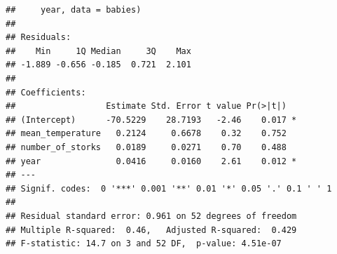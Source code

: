 \documentclass[12pt,a4paper]{scrartcl}\usepackage[]{graphicx}\usepackage[]{color}
\makeatletter
\newenvironment{kframe}{%
 \def\at@end@of@kframe{}%
 \ifinner\ifhmode%
  \def\at@end@of@kframe{\end{minipage}}%
  \begin{minipage}{\columnwidth}%
 \fi\fi%
 \def\FrameCommand##1{\hskip\@totalleftmargin \hskip-\fboxsep
 \colorbox{shadecolor}{##1}\hskip-\fboxsep
     \hskip-\linewidth \hskip-\@totalleftmargin \hskip\columnwidth}%
 \MakeFramed {\advance\hsize-\width
   \@totalleftmargin\z@ \linewidth\hsize
   \@setminipage}}%
 {\par\unskip\endMakeFramed%
 \at@end@of@kframe}
\newenvironment{knitrout}{}{} %
\makeatother
\begin{document}
\begin{Answer}
\begin{knitrout}
\begin{kframe}
\begin{verbatim}
##     year, data = babies)
## 
## Residuals:
##    Min     1Q Median     3Q    Max 
## -1.889 -0.656 -0.185  0.721  2.101 
## 
## Coefficients:
##                  Estimate Std. Error t value Pr(>|t|)  
## (Intercept)      -70.5229    28.7193   -2.46    0.017 *
## mean_temperature   0.2124     0.6678    0.32    0.752  
## number_of_storks   0.0189     0.0271    0.70    0.488  
## year               0.0416     0.0160    2.61    0.012 *
## ---
## Signif. codes:  0 '***' 0.001 '**' 0.01 '*' 0.05 '.' 0.1 ' ' 1
## 
## Residual standard error: 0.961 on 52 degrees of freedom
## Multiple R-squared:  0.46,	Adjusted R-squared:  0.429 
## F-statistic: 14.7 on 3 and 52 DF,  p-value: 4.51e-07
\end{verbatim}
\end{kframe}
\end{knitrout}
\end{Answer}
\end{document}
